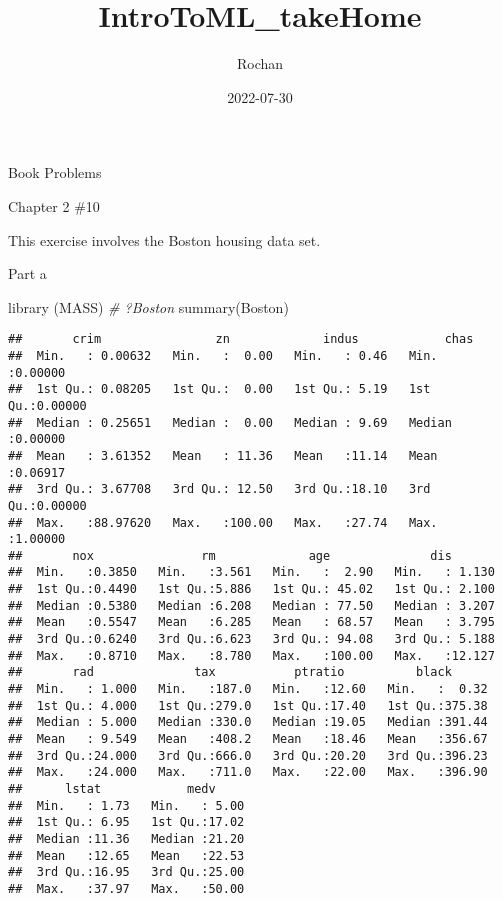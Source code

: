 \documentclass[
]{article}
\title{IntroToML\_takeHome}
\author{Rochan}
\date{2022-07-30}
\newenvironment{Shaded}{\begin{snugshade}}{\end{snugshade}}
\newcommand{\CommentTok}[1]{\textcolor[rgb]{0.56,0.35,0.01}{\textit{#1}}}
\newcommand{\FunctionTok}[1]{\textcolor[rgb]{0.00,0.00,0.00}{#1}}
\newcommand{\NormalTok}[1]{#1}
\begin{document}
\maketitle

Book Problems

Chapter 2 \#10

This exercise involves the Boston housing data set.

Part a

\begin{Shaded}
\begin{Highlighting}[]
\FunctionTok{library}\NormalTok{ (MASS)}
\CommentTok{\# ?Boston}
\FunctionTok{summary}\NormalTok{(Boston)}
\end{Highlighting}
\end{Shaded}

\begin{verbatim}
##       crim                zn             indus            chas        
##  Min.   : 0.00632   Min.   :  0.00   Min.   : 0.46   Min.   :0.00000  
##  1st Qu.: 0.08205   1st Qu.:  0.00   1st Qu.: 5.19   1st Qu.:0.00000  
##  Median : 0.25651   Median :  0.00   Median : 9.69   Median :0.00000  
##  Mean   : 3.61352   Mean   : 11.36   Mean   :11.14   Mean   :0.06917  
##  3rd Qu.: 3.67708   3rd Qu.: 12.50   3rd Qu.:18.10   3rd Qu.:0.00000  
##  Max.   :88.97620   Max.   :100.00   Max.   :27.74   Max.   :1.00000  
##       nox               rm             age              dis        
##  Min.   :0.3850   Min.   :3.561   Min.   :  2.90   Min.   : 1.130  
##  1st Qu.:0.4490   1st Qu.:5.886   1st Qu.: 45.02   1st Qu.: 2.100  
##  Median :0.5380   Median :6.208   Median : 77.50   Median : 3.207  
##  Mean   :0.5547   Mean   :6.285   Mean   : 68.57   Mean   : 3.795  
##  3rd Qu.:0.6240   3rd Qu.:6.623   3rd Qu.: 94.08   3rd Qu.: 5.188  
##  Max.   :0.8710   Max.   :8.780   Max.   :100.00   Max.   :12.127  
##       rad              tax           ptratio          black       
##  Min.   : 1.000   Min.   :187.0   Min.   :12.60   Min.   :  0.32  
##  1st Qu.: 4.000   1st Qu.:279.0   1st Qu.:17.40   1st Qu.:375.38  
##  Median : 5.000   Median :330.0   Median :19.05   Median :391.44  
##  Mean   : 9.549   Mean   :408.2   Mean   :18.46   Mean   :356.67  
##  3rd Qu.:24.000   3rd Qu.:666.0   3rd Qu.:20.20   3rd Qu.:396.23  
##  Max.   :24.000   Max.   :711.0   Max.   :22.00   Max.   :396.90  
##      lstat            medv      
##  Min.   : 1.73   Min.   : 5.00  
##  1st Qu.: 6.95   1st Qu.:17.02  
##  Median :11.36   Median :21.20  
##  Mean   :12.65   Mean   :22.53  
##  3rd Qu.:16.95   3rd Qu.:25.00  
##  Max.   :37.97   Max.   :50.00
\end{verbatim}
\end{document}

